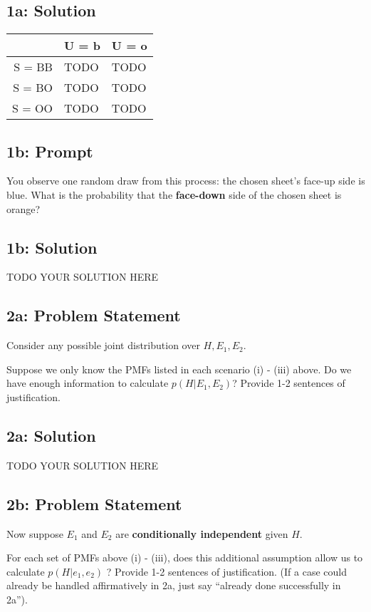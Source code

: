 \documentclass[10pt]{article}
\newcommand{\officialdirections}[1]{{\color{purple} #1}}
\begin{document}
\subsection{1a: Solution}

\begin{tabular}{r | l l}
         &  U = b  & U = o    \\ \hline 
S = BB  &  TODO  & TODO   \\
S = BO  &  TODO  & TODO    \\
S = OO  &  TODO &  TODO
\end{tabular}



\newpage
\officialdirections{
\subsection*{1b: Prompt}
You observe one random draw from this process: the chosen sheet's face-up side is blue.
What is the probability that the \textbf{face-down} side of the chosen sheet is orange?
}

\subsection{1b: Solution}
TODO YOUR SOLUTION HERE



\newpage
\officialdirections{
\subsection*{2a: Problem Statement}
Consider any possible joint distribution over $H, E_1, E_2$.

Suppose we only know the PMFs listed in each scenario (i) - (iii) above. Do we have enough information to calculate $p(H | E_1, E_2)$? Provide 1-2 sentences of justification.
}

\subsection{2a: Solution}
TODO YOUR SOLUTION HERE



\newpage
\officialdirections{
\subsection*{2b: Problem Statement}
Now suppose $E_1$ and $E_2$ are \textbf{conditionally independent} given $H$.

For each set of PMFs above (i) - (iii), does this additional assumption allow us to calculate $p(H | e_1, e_2)$ ? Provide 1-2 sentences of justification. (If a case could already be handled affirmatively in 2a, just say ``already done successfully in 2a'').
}
\end{document}
